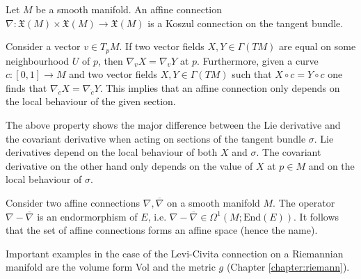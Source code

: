     \begin{example}
        Let $M$ be a smooth manifold. An affine connection $\nabla:\mathfrak{X}(M)\times\mathfrak{X}(M)\rightarrow \mathfrak{X}(M)$ is a Koszul connection on the tangent bundle.
    \end{example}

    \begin{property}
        Consider a vector $v\in T_pM$. If two vector fields $X, Y\in \Gamma(TM)$ are equal on some neighbourhood $U$ of $p$, then $\nabla_vX = \nabla_vY$ at $p$. Furthermore, given a curve $c:[0, 1]\rightarrow M$ and two vector fields $X, Y\in\Gamma(TM)$ such that $X\circ c = Y\circ c$ one finds that $\nabla_{\dot c}X = \nabla_{\dot c}Y$. This implies that an affine connection only depends on the local behaviour of the given section.
    \end{property}
    \begin{remark}
        The above property shows the major difference between the Lie derivative and the covariant derivative when acting on sections of the tangent bundle $\sigma$. Lie derivatives depend on the local behaviour of both $X$ and $\sigma$. The covariant derivative on the other hand only depends on the value of $X$ at $p\in M$ and on the local behaviour of $\sigma$.
    \end{remark}

    \begin{property}[Affinity]
        Consider two affine connections $\nabla, \overline\nabla$ on a smooth manifold $M$. The operator $\nabla-\overline\nabla$ is an endormorphism of $E$, i.e. $\nabla-\overline\nabla\in\Omega^1(M;\text{End}(E))$. It follows that the set of affine connections forms an affine space (hence the name).
    \end{property}

    \begin{example}
        Important examples in the case of the Levi-Civita connection on a Riemannian manifold are the volume form Vol and the metric $g$ (Chapter \ref{chapter:riemann}).
    \end{example}

